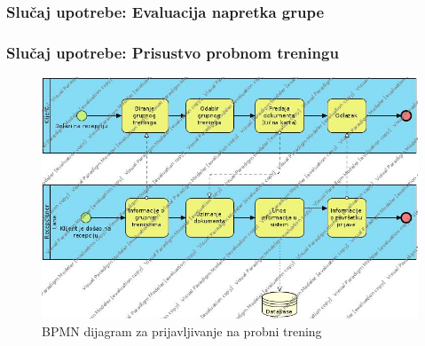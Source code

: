 \documentclass[../main.tex]{subfiles}
\begin{document}
\subsubsection{Slučaj upotrebe: Evaluacija napretka grupe}


\subsubsection{Slučaj upotrebe: Prisustvo probnom treningu}


\begin{figure}[!ht]
\begin{center}
\includegraphics[scale=0.55]{sections/images/bpmn_probni_trening.jpg}
\end{center}
\caption{BPMN dijagram za prijavljivanje na probni trening}
\label{fig:kontekst}
\end{figure}
\end{document}
